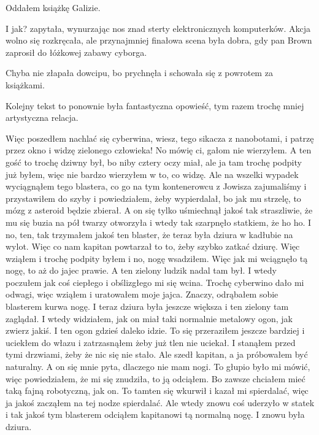 Oddałem książkę Galizie.

\begin{dialogue}
	\ds{} I jak? \dm{} zapytała, wynurzając nos znad sterty elektronicznych komputerków.
	\ds{} Akcja wolno się rozkręcała, ale przynajmniej finałowa scena była dobra, gdy pan Brown zaprosił do łóżkowej zabawy cyborga.
\end{dialogue}

Chyba nie złapała dowcipu, bo prychnęła i schowała się z powrotem za książkami.

Kolejny tekst to ponownie była fantastyczna opowieść, tym razem trochę mniej artystyczna relacja.

\begin{poem}
	Więc poszedłem nachlać się cyberwina, wiesz, tego sikacza z nanobotami, i patrzę przez okno i widzę zielonego człowieka!
	No mówię ci, gałom nie wierzyłem. A ten gość to trochę dziwny był, bo niby cztery oczy miał, ale ja tam trochę podpity już byłem, więc nie bardzo wierzyłem w to, co widzę.
	Ale na wszelki wypadek wyciągnąłem tego blastera, co go na tym kontenerowcu z Jowisza zajumaliśmy i przystawiłem do szyby i powiedziałem, żeby wypierdalał, bo jak mu strzelę, to mózg z asteroid będzie zbierał.
	A on się tylko uśmiechnął jakoś tak straszliwie, że mu się buzia na pół twarzy otworzyła i wtedy tak szarpnęło statkiem, że ho ho.
	I no, ten, tak trzymałem jakoś ten blaster, że teraz była dziura w kadłubie na wylot. Więc co nam kapitan powtarzał to to, żeby szybko zatkać dziurę.
	Więc wziąłem i trochę podpity byłem i no, nogę wsadziłem.
	Więc jak mi wciągnęło tą nogę, to aż do jajec prawie. A ten zielony ludzik nadal tam był. I wtedy poczułem jak coś ciepłego i obślizgłego mi się wcina.
	Trochę cyberwino dało mi odwagi, więc wziąłem i uratowałem moje jajca.
	Znaczy, odrąbałem sobie blasterem kurwa nogę. 
	I teraz dziura była jeszcze większa i ten zielony tam zaglądał.
	I wtedy widziałem, jak on miał taki normalnie metalowy ogon, jak zwierz jakiś. I ten ogon gdzieś daleko idzie.
	To się przeraziłem jeszcze bardziej i uciekłem do włazu i zatrzasnąłem żeby już tlen nie uciekał.
	I stanąłem przed tymi drzwiami, żeby że nic się nie stało. Ale szedł kapitan, a ja próbowałem być naturalny.
	A on się mnie pyta, dlaczego nie mam nogi.
	To głupio było mi mówić, więc powiedziałem, że mi się znudziła, to ją odciąłem. Bo zawsze chciałem mieć taką fajną robotyczną, jak on.
	To tamten się wkurwił i kazał mi spierdalać, więc ja jakoś zacząłem na tej nodze spierdalać.
	Ale wtedy znowu coś uderzyło w statek i tak jakoś tym blasterem odciąłem kapitanowi tą normalną nogę. I znowu była dziura.

\end{poem}
